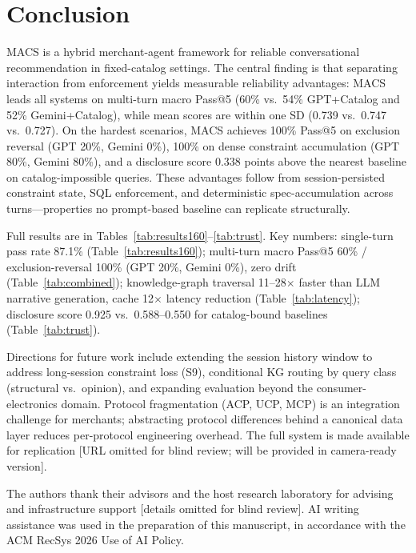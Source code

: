 \documentclass[sigconf,anonymous]{acmart}
\newcommand{\GPTCatalog}{GPT\allowbreak{}+\allowbreak{}Catalog}
\newcommand{\GeminiCatalog}{Gemini\allowbreak{}+\allowbreak{}Catalog}
\begin{document}
\section{Conclusion}

MACS is a hybrid merchant-agent framework for reliable conversational
recommendation in fixed-catalog settings. The central finding is that
separating interaction from enforcement yields measurable reliability
advantages: MACS leads all systems on multi-turn macro Pass@5 (60\% vs.\
54\% \GPTCatalog{} and 52\% \GeminiCatalog{}), while mean scores are within
one SD (0.739 vs.\ 0.747 vs.\ 0.727). On the hardest scenarios, MACS achieves
100\% Pass@5 on exclusion reversal (GPT 20\%, Gemini 0\%), 100\% on dense
constraint accumulation (GPT 80\%, Gemini 80\%), and a disclosure score
0.338 points above the nearest baseline on catalog-impossible queries. These
advantages follow from session-persisted constraint state, SQL enforcement,
and deterministic spec-accumulation across turns---properties no prompt-based
baseline can replicate structurally.

Full results are in Tables~\ref{tab:results160}--\ref{tab:trust}.
Key numbers: single-turn pass rate 87.1\% (Table~\ref{tab:results160});
multi-turn macro Pass@5 60\% / exclusion-reversal 100\% (GPT 20\%, Gemini 0\%), zero drift
(Table~\ref{tab:combined}); knowledge-graph traversal 11--28$\times$ faster
than LLM narrative generation, cache 12$\times$ latency reduction
(Table~\ref{tab:latency}); disclosure score 0.925 vs.\ 0.588--0.550
for catalog-bound baselines (Table~\ref{tab:trust}).

Directions for future work include extending the session history window to
address long-session constraint loss (S9), conditional KG routing by query
class (structural vs.\ opinion), and expanding evaluation beyond the
consumer-electronics domain. Protocol fragmentation (ACP, UCP, MCP) is an
integration challenge for merchants; abstracting protocol differences behind
a canonical data layer reduces per-protocol engineering overhead.
The full system is made available for replication
[URL omitted for blind review; will be provided in camera-ready version].

\begin{acks}
The authors thank their advisors and the host research laboratory for
advising and infrastructure support [details omitted for blind review].
AI writing assistance was used in the preparation of this manuscript, in
accordance with the ACM RecSys 2026 Use of AI Policy.
\end{acks}



\end{document}
